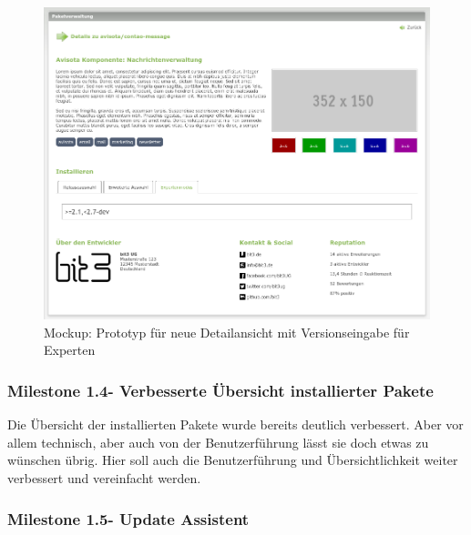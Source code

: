 \documentclass[
paper=a4,
draft=false,%
fontsize=10pt%
]{scrartcl}
\begin{document}
\begin{figure}[p]
  \centering
  \includegraphics[width=\textwidth]{bilder/mockup-details-3}
  \caption{Mockup: Prototyp für neue Detailansicht mit Versionseingabe für Experten}
\end{figure}

\pagebreak

\subsubsection[Milestone 1.4 - Verbesserte Übersicht installierter Pakete]{Milestone 1.4\footnotemark - Verbesserte Übersicht installierter Pakete}
\label{subsec:ccc-milestone-1.4}

Die Übersicht der installierten Pakete wurde bereits deutlich verbessert. Aber vor allem technisch, aber auch von der Benutzerführung lässt sie doch etwas zu wünschen übrig. Hier soll auch die Benutzerführung und Übersichtlichkeit weiter verbessert und vereinfacht werden.

\subsubsection[Milestone 1.5 - Update Assistent]{Milestone 1.5\footnotemark - Update Assistent}
\label{subsec:ccc-milestone-1.5}
\end{document}
